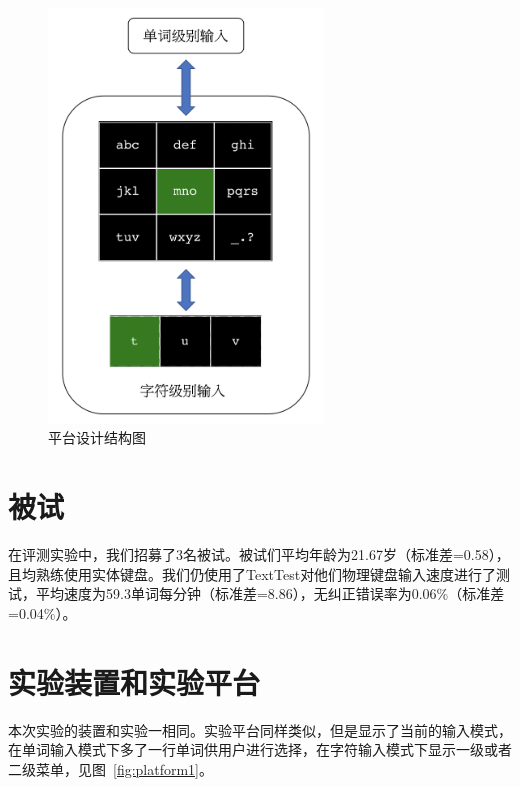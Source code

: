 \begin{figure}[htbp] %
    \centering
    \includegraphics[height=11cm]{figures/design.png}
    \caption{平台设计结构图}
    \label{fig:design}
\end{figure}

\section{被试}
在评测实验中，我们招募了3名被试。被试们平均年龄为21.67岁（标准差=0.58），且均熟练使用实体键盘。我们仍使用了TextTest\cite{texttest}\cite{wobbrock2006analyzing}对他们物理键盘输入速度进行了测试，平均速度为59.3单词每分钟（标准差=8.86），无纠正错误率为0.06\%（标准差=0.04\%）。

\section{实验装置和实验平台}
本次实验的装置和实验一相同。实验平台同样类似，但是显示了当前的输入模式，在单词输入模式下多了一行单词供用户进行选择，在字符输入模式下显示一级或者二级菜单，见图~\ref{fig:platform1}。

